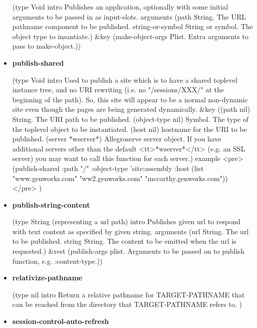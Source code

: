 \documentclass [11pt]{book}
\begin{document}
\begin{itemize}
(type Void intro
  Publishes an application, optionally with some initial arguments to be passed in as input-slots.
 arguments
 (path String. The URL pathname component to be published.
  string-or-symbol String or symbol. The object type to insantiate.)
 \&key (make-object-args Plist. Extra arguments to pass to make-object.))



\item {}
\label{prim:publish-shared}
\textbf{publish-shared}

(type Void intro
  Used to publish a site which is to have a shared toplevel instance tree,
and no URI rewriting (i.e. no "/sessions/XXX/" at the beginning of the path). So,
this site will appear to be a normal non-dynamic site even though the pages are
being generated dynamically.
 \&key
 ((path nil) String. The URI path to be published. (object-type nil)
  Symbol. The type of the toplevel object to be instantiated.
  (host nil) hostname for the URI to be published. (server *wserver*)
  Allegroserve server object. If you have additional servers other than the default
<tt>*wserver*</tt> (e.g. an SSL server) you may want to call this function for each server.)
 example <pre> 
  (publish-shared :path "/"
                  :object-type 'site:assembly
                  :host (list "www.genworks.com" "ww2.genworks.com" "mccarthy.genworks.com"))
</pre>
)



\item {}
\label{prim:publish-string-content}
\textbf{publish-string-content}

(type String (representing a url path) intro
  Publishes given url to respond with text content as
specified by given string.
 arguments
 (url String. The url to be published. string
  String. The content to be emitted when the url is requested.)
 \&rest
 (publish-args
  plist. Arguments to be passed on to publish function, e.g. :content-type.))



\item {}
\label{prim:relativize-pathname}
\textbf{relativize-pathname}

(type nil intro
 Return a relative pathname for TARGET-PATHNAME that can be reached
from the directory that TARGET-PATHNAME refers to.
)



\item {}
\label{prim:session-control-auto-refresh}
\textbf{session-control-auto-refresh}


\end{itemize}
\end{document}
